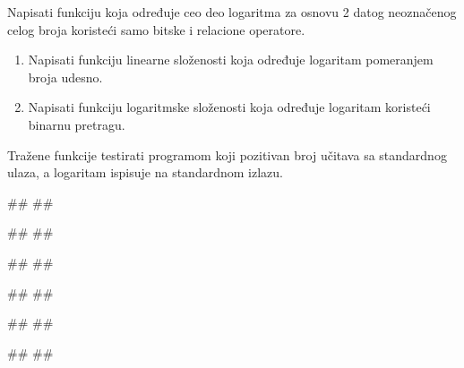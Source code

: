 \begin{Answer}[ref=408]
\end{Answer}
\begin{Exercise}[label=409]
  Napisati funkciju koja određuje ceo deo logaritma za osnovu 2 datog
  neoznačenog celog broja koristeći samo bitske i relacione
  operatore.
  \begin{enumerate}
  \item Napisati funkciju linearne složenosti koja određuje
    logaritam pomeranjem broja udesno.
  \item Napisati funkciju logaritmske složenosti koja određuje
    logaritam koristeći binarnu pretragu.
  \end{enumerate}
  Tražene funkcije testirati programom koji pozitivan broj učitava sa
  standardnog ulaza, a logaritam ispisuje na standardnom izlazu.

\begin{minitest}
\begin{test}{1}
#\naslovUlaz#
##
  
#\naslovIzlaz#
##
\end{test}
\end{minitest}
\begin{minitest}
\begin{test}{2}
#\naslovUlaz#
##
  
#\naslovIzlaz#
##
\end{test}
\end{minitest}
\begin{minitest}
\begin{test}{3}
#\naslovUlaz#
##
  
#\naslovIzlaz#
##
\end{test}
\end{minitest}


\end{Exercise}

